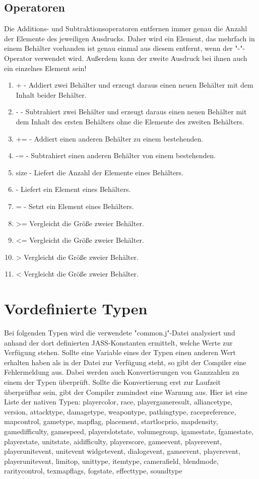 \subsection{Operatoren}
Die Additions- und Subtraktionsoperatoren entfernen immer genau die Anzahl der Elemente des jeweiligen Ausdrucks.
Daher wird ein Element, das mehrfach in einem Behälter vorhanden ist genau einmal aus diesem entfernt, wenn der "-"-Operator
verwendet wird.
Außerdem kann der zweite Ausdruck bei ihnen auch ein einzelnes Element sein!
\begin{enumerate}
\item + - Addiert zwei Behälter und erzeugt daraus einen neuen Behälter mit dem Inhalt beider Behälter.
\item - - Subtrahiert zwei Behälter und erzeugt daraus einen neuen Behälter mit dem Inhalt des ersten Behälters ohne die Elemente des zweiten Behälters.
\item += - Addiert einen anderen Behälter zu einem bestehenden.
\item -= - Subtrahiert einen anderen Behälter von einem bestehenden.
\item size - Liefert die Anzahl der Elemente eines Behälters.
\item [] - Liefert ein Element eines Behälters.
\item []= - Setzt ein Element eines Behälters.
\item >= Vergleicht die Größe zweier Behälter.
\item <= Vergleicht die Größe zweier Behälter.
\item > Vergleicht die Größe zweier Behälter.
\item < Vergleicht die Größe zweier Behälter.
\end{enumerate}

\section{Vordefinierte Typen}
Bei folgenden Typen wird die verwendete "common.j"-Datei analysiert und anhand der dort definierten JASS-Konstanten
ermittelt, welche Werte zur Verfügung stehen. Sollte eine Variable eines der Typen einen anderen Wert erhalten
haben als in der Datei zur Verfügung steht, so gibt der Compiler eine Fehlermeldung aus.
Dabei werden auch Konvertierungen von Ganzzahlen zu einem der Typen überprüft. Sollte die Konvertierung erst zur
Laufzeit überprüfbar sein, gibt der Compiler zumindest eine Warnung aus.
Hier ist eine Liste der nativen Typen:
playercolor, race, playergameresult, alliancetype, version, attacktype, damagetype, weapontype, pathingtype, racepreference,
mapcontrol, gametype, mapflag, placement, startlocprio, mapdensity, gamedifficulty, gamespeed, playerslotstate, volumegroup,
igamestate, fgamestate, playerstate, unitstate, aidifficulty, playerscore, gameevent, playerevent, playerunitevent, unitevent
widgetevent, dialogevent, gameevent, playerevent, playerunitevent, limitop, unittype, itemtype, camerafield, blendmode, raritycontrol,
texmapflags, fogstate, effecttype, soundtype 
